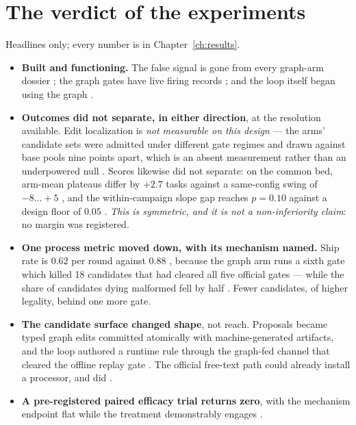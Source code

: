 \section{The verdict of the experiments}
\label{sec:verdict}

Headlines only; every number is in Chapter~\ref{ch:results}.

\begin{itemize}
  \item \textbf{Built and functioning.} The false signal is gone from every
        graph-arm dossier ; the graph gates have live firing records
        ; and the loop itself began using the graph .
  \item \textbf{Outcomes did not separate, in either direction}, at the
        resolution available. Edit localization is \emph{not measurable on
        this design} --- the arms' candidate sets were admitted under
        different gate regimes and drawn against base pools nine points
        apart, which is an absent measurement rather than an underpowered
        null . Scores likewise did not separate: on the common
        bed, arm-mean plateaus differ by $+2.7$ tasks against a same-config
        swing of $-8\ldots{+}5$ , and the within-campaign slope gap
        reaches $p = 0.10$ against a design floor of $0.05$ .
        \emph{This is symmetric, and it is not a non-inferiority claim}: no
        margin was registered.
  \item \textbf{One process metric moved down, with its mechanism named.}
        Ship rate is $0.62$ per round against $0.88$ , because the
        graph arm runs a sixth gate which killed 18 candidates that had
        cleared all five official gates --- while the share of candidates
        dying malformed fell by half . Fewer candidates, of higher
        legality, behind one more gate.
  \item \textbf{The candidate surface changed shape}, not reach. Proposals
        became typed graph edits committed atomically with machine-generated
        artifacts, and the loop authored a runtime rule through the
        graph-fed channel that cleared the offline replay gate .
        The official free-text path could already install a processor, and
        did .
  \item \textbf{A pre-registered paired efficacy trial returns zero}, with
        the mechanism endpoint flat while the treatment demonstrably
        engages .
\end{itemize}

